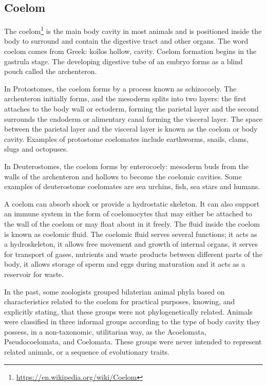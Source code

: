 \documentclass[]{book}
\let\rmarkdownfootnote\footnote%
\def\footnote{\protect\rmarkdownfootnote}
\renewcommand{\href}[2]{#2\footnote{\url{#1}}}
\theoremstyle{definition}
\theoremstyle{definition}
\theoremstyle{definition}
\theoremstyle{remark}
\begin{document}
\begin{enumerate}
\section{Coelom}\label{coelom}

The \href{https://en.wikipedia.org/wiki/Coelom}{coelom} is the main body
cavity in most animals and is positioned inside the body to surround and
contain the digestive tract and other organs. The word coelom comes from
Greek: koîlos hollow, cavity. Coelom formation begins in the gastrula
stage. The developing digestive tube of an embryo forms as a blind pouch
called the archenteron.

In Protostomes, the coelom forms by a process known as schizocoely. The
archenteron initially forms, and the mesoderm splits into two layers:
the first attaches to the body wall or ectoderm, forming the parietal
layer and the second surrounds the endoderm or alimentary canal forming
the visceral layer. The space between the parietal layer and the
visceral layer is known as the coelom or body cavity. Examples of
protostome coelomates include earthworms, snails, clams, slugs and
octopuses.

In Deuterostomes, the coelom forms by enterocoely: mesoderm buds from
the walls of the archenteron and hollows to become the coelomic
cavities. Some examples of deuterostome coelomates are sea urchins,
fish, sea stars and humans.

A coelom can absorb shock or provide a hydrostatic skeleton. It can also
support an immune system in the form of coelomocytes that may either be
attached to the wall of the coelom or may float about in it freely. The
fluid inside the coelom is known as coelomic fluid. The coelomic fluid
serves several functions; it acts as a hydroskeleton, it allows free
movement and growth of internal organs, it serves for transport of
gases, nutrients and waste products between different parts of the body,
it allows storage of sperm and eggs during maturation and it acts as a
reservoir for waste.

In the past, some zoologists grouped bilaterian animal phyla based on
characteristics related to the coelom for practical purposes, knowing,
and explicitly stating, that these groups were not phylogenetically
related. Animals were classified in three informal groups according to
the type of body cavity they possess, in a non-taxonomic, utilitarian
way, as the Acoelomata, Pseudocoelomata, and Coelomata. These groups
were never intended to represent related animals, or a sequence of
evolutionary traits.


\end{enumerate}
\end{document}
